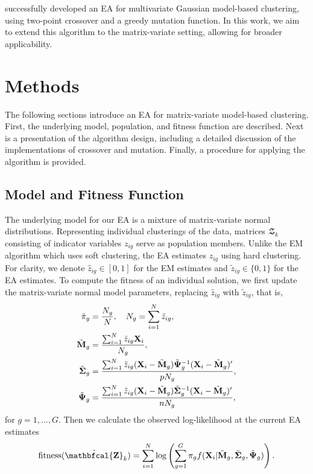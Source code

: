 \documentclass[12pt]{report}
\begin{document}
\citet{mcnicholas2020} successfully developed an EA for multivariate Gaussian model-based clustering, using two-point crossover and a greedy mutation function. In this work, we aim to extend this algorithm to the matrix-variate setting, allowing for broader applicability.






\chapter{Methods}
The following sections introduce an EA for matrix-variate model-based clustering. First, the underlying model, population, and fitness function are described. Next is a presentation of the algorithm design, including a detailed discussion of the implementations of crossover and mutation. Finally, a procedure for applying the algorithm is provided.




\section{Model and Fitness Function}
The underlying model for our EA is a mixture of matrix-variate normal distributions. Representing individual clusterings of the data, matrices $\mathbfcal{Z}_k$ consisting of indicator variables $z_{ig}$ serve as population members. Unlike the EM algorithm which uses soft clustering, the EA estimates $z_{ig}$ using hard clustering. For clarity, we denote $\hat{z}_{ig} \in [0, 1]$ for the EM estimates and $\tilde{z}_{ig} \in \{0, 1\}$ for the EA estimates. To compute the fitness of an individual solution, we first update the matrix-variate normal model parameters, replacing $\hat{z}_{ig}$ with $\tilde{z}_{ig}$, that is,
\[
\begin{aligned}
\tilde{\pi}_g & = \frac{N_g}{N}, \quad N_g = \sum_{i=1}^N \tilde{z}_{ig}, \\
\tilde{{\bf M}}_g & = \frac{\sum_{i=1}^N \tilde{z}_{ig}{\bf X}_i}{N_g}, \\
\tilde{{\bf \Sigma}}_g & = \frac{\sum_{i=1}^N \tilde{z}_{ig}({\bf X}_i - \tilde{\bf M}_g) \tilde{\bf \Psi}_g^{-1}({\bf X}_i - \tilde{\bf M}_g)'}{pN_g}, \\
\tilde{{\bf \Psi}}_g & = \frac{\sum_{i=1}^N \tilde{z}_{ig}({\bf X}_i - \tilde{\bf M}_g) \tilde{\bf \Sigma}_g^{-1}({\bf X}_i - \tilde{\bf M}_g)'}{nN_g},
\end{aligned}
\]
for $g = 1, \dots, G$. Then we calculate the observed log-likelihood at the current EA estimates  
\begin{equation*}
\text{fitness}(\tilde{\bf \mathbfcal{Z}}_k) = \sum_{i=1}^N \log \left (\sum_{g=1}^G\pi_g f({\bf X}_i | \tilde{\bf M}_g, \tilde{\bf \Sigma}_g, \tilde{\bf \Psi}_g)\right).
\end{equation*} 
\end{document}
